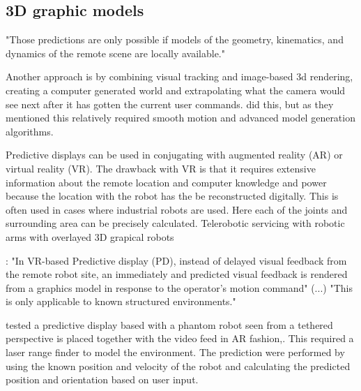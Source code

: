 \subsection{3D graphic models}

\citep{Burkert2004} "Those predictions are only possible if models of the geometry, kinematics, and dynamics of the remote scene are locally available."

Another approach is by combining visual tracking and image-based 3d rendering, creating a computer generated world and extrapolating what the camera would see next after it has gotten the current user commands. \citep{Hu2015} did this, but as they mentioned this relatively required smooth motion and advanced model generation algorithms.

Predictive displays can be used in conjugating with augmented reality (AR) or virtual reality (VR). The drawback with VR is that it requires extensive information about the remote location and computer knowledge and power because the location with the robot has the be reconstructed digitally. This is often used in cases where industrial robots are used. Here each of the joints and surrounding area can be precisely calculated. Telerobotic servicing with robotic arms with overlayed 3D grapical robots \citep{Kim1993}

\citep{Hu2016}: "In VR-based Predictive display (PD), instead of delayed visual feedback from the remote robot site, an immediately and predicted visual feedback is rendered from a graphics model in response to the operator's motion command" (...) "This is only applicable to known structured environments."

\citep{Ricks2004} tested a predictive display based with a phantom robot seen from a tethered perspective is placed together with the video feed in AR fashion,. This required a laser range finder to model the environment. The prediction were performed by using the known position and velocity of the robot and calculating the predicted position and orientation based on user input.

